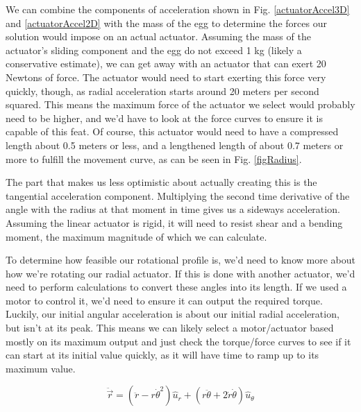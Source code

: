 \documentclass[nofoot,pdf-a,balance,colorlinks,upint,subscriptcorrection,varvw,mathalfa=cal=boondoxo]{asmeconf}
\begin{document}
        We can combine the components of acceleration shown in Fig. \ref{actuatorAccel3D} and \ref{actuatorAccel2D} with the mass of the egg to determine the forces our solution would impose on an actual actuator. Assuming the mass of the actuator's sliding component and the egg do not exceed 1 kg (likely a conservative estimate), we can get away with an actuator that can exert 20 Newtons of force. The actuator would need to start exerting this force very quickly, though, as radial acceleration starts around 20 meters per second squared. This means the maximum force of the actuator we select would probably need to be higher, and we'd have to look at the force curves to ensure it is capable of this feat. Of course, this actuator would need to have a compressed length about 0.5 meters or less, and a lengthened length of about 0.7 meters or more to fulfill the movement curve, as can be seen in Fig. \ref{figRadius}.

        The part that makes us less optimistic about actually creating this is the tangential acceleration component. Multiplying the second time derivative of the angle with the radius at that moment in time gives us a sideways acceleration. Assuming the linear actuator is rigid, it will need to resist shear and a bending moment, the maximum magnitude of which we can calculate.

        To determine how feasible our rotational profile is, we'd need to know more about how we're rotating our radial actuator. If this is done with another actuator, we'd need to perform calculations to convert these angles into its length. If we used a motor to control it, we'd need to ensure it can output the required torque. Luckily, our initial angular acceleration is about our initial radial acceleration, but isn't at its peak. This means we can likely select a motor/actuator based mostly on its maximum output and just check the torque/force curves to see if it can start at its initial value quickly, as it will have time to ramp up to its maximum value.

        \begin{equation} 
            \ddot{\vec{r}} = \left(\ddot{r} - r{\dot{\theta}}^2\right)\hat{u}_r + \left(r\ddot{\theta} + 2\dot{r}\dot{\theta}\right)\hat{u}_{\theta}
        \end{equation}
\end{document}
